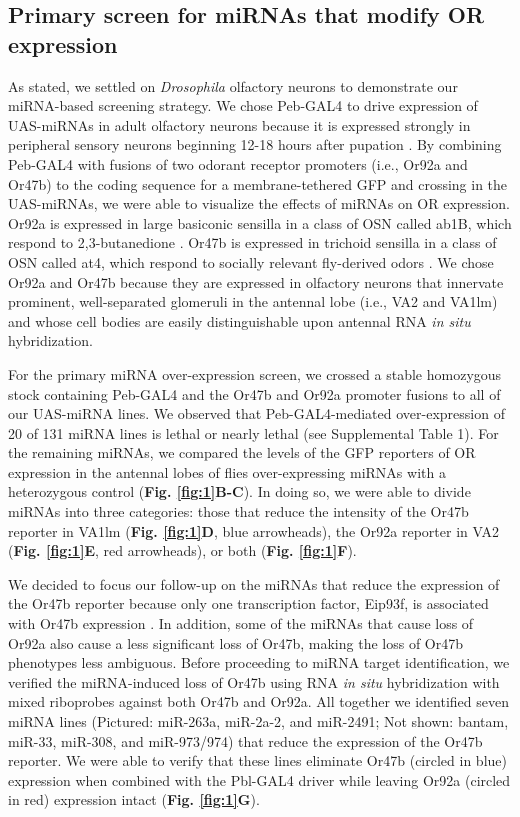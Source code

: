\subsection*{Primary screen for miRNAs that modify OR expression}

As stated, we settled on \emph{Drosophila} olfactory neurons to demonstrate our miRNA-based screening strategy.
We chose Peb-GAL4 to drive expression of UAS-miRNAs in adult olfactory neurons because it is expressed strongly in peripheral sensory neurons beginning 12-18 hours after pupation \cite{dnik_Dickson_Luo_Komiyama_2007}.
By combining Peb-GAL4 with fusions of two odorant receptor promoters (i.e., Or92a and Or47b) to the coding sequence for a membrane-tethered GFP and crossing in the UAS-miRNAs, we were able to visualize the effects of miRNAs on OR expression.
Or92a is expressed in large basiconic sensilla in a class of OSN called ab1B, which respond to 2,3-butanedione \cite{de_Bruyne_Foster_Carlson_2001}.
Or47b is expressed in trichoid sensilla in a class of OSN called at4, which respond to socially relevant fly-derived odors \cite{vanderGoesvanNaters:2007cq}.
We chose Or92a and Or47b because they are expressed in olfactory neurons that innervate prominent, well-separated glomeruli in the antennal lobe (i.e., VA2 and VA1lm) and whose cell bodies are easily distinguishable upon antennal RNA \emph{in situ} hybridization.

For the primary miRNA over-expression screen, we crossed a stable homozygous stock containing Peb-GAL4 and the Or47b and Or92a promoter fusions to all of our UAS-miRNA lines.
We observed that Peb-GAL4-mediated over-expression of 20 of 131 miRNA lines is lethal or nearly lethal (see Supplemental Table 1).
For the remaining miRNAs, we compared the levels of the GFP reporters of OR expression in the antennal lobes of flies over-expressing miRNAs with a heterozygous control (\textbf{Fig. \ref{fig:1}B-C}).
In doing so, we were able to divide miRNAs into three categories: those that reduce the intensity of the Or47b reporter in VA1lm (\textbf{Fig. \ref{fig:1}D}, blue arrowheads), the Or92a reporter in VA2 (\textbf{Fig. \ref{fig:1}E}, red arrowheads), or both (\textbf{Fig. \ref{fig:1}F}).

We decided to focus our follow-up on the miRNAs that reduce the expression of the Or47b reporter because only one transcription factor, Eip93f, is associated with Or47b expression \cite{Brochtrup_Hummel_Alenius_2012}.
In addition, some of the miRNAs that cause loss of Or92a also cause a less significant loss of Or47b, making the loss of Or47b phenotypes less ambiguous.
Before proceeding to miRNA target identification, we verified the miRNA-induced loss of Or47b using RNA \emph{in situ} hybridization with mixed riboprobes against both Or47b and Or92a.
All together we identified seven miRNA lines (Pictured: miR-263a, miR-2a-2, and miR-2491; Not shown: bantam, miR-33, miR-308, and miR-973/974) that reduce the expression of the Or47b reporter.
We were able to verify that these lines eliminate Or47b (circled in blue) expression when combined with the Pbl-GAL4 driver while leaving Or92a (circled in red) expression intact (\textbf{Fig. \ref{fig:1}G}).
